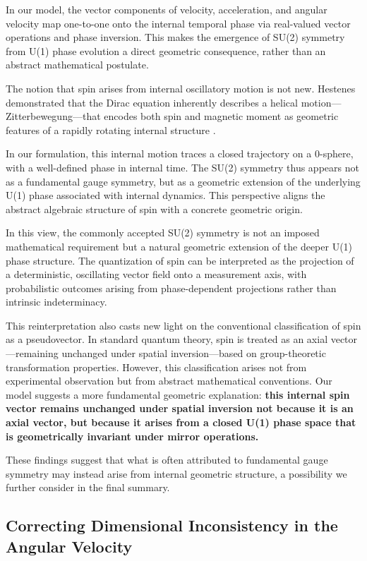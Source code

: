 \documentclass[%
 reprint,
 amsmath,amssymb,
 aps,
]{revtex4-1}
\numberwithin{equation}{section}%
\begin{document}
In our model, the vector components of velocity, acceleration, and angular velocity map one-to-one onto the internal temporal phase via real-valued vector operations and phase inversion. This makes the emergence of SU(2) symmetry from U(1) phase evolution a direct geometric consequence, rather than an abstract mathematical postulate.

The notion that spin arises from internal oscillatory motion is not new. Hestenes demonstrated that the Dirac equation inherently describes a helical motion—Zitterbewegung—that encodes both spin and magnetic moment as geometric features of a rapidly rotating internal structure \cite{hestenes2010}.

In our formulation, this internal motion traces a closed trajectory on a 0-sphere, with a well-defined phase in internal time. The SU(2) symmetry thus appears not as a fundamental gauge symmetry, but as a geometric extension of the underlying U(1) phase associated with internal dynamics. This perspective aligns the abstract algebraic structure of spin with a concrete geometric origin.

In this view, the commonly accepted SU(2) symmetry is not an imposed mathematical requirement but a natural geometric extension of the deeper U(1) phase structure. The quantization of spin can be interpreted as the projection of a deterministic, oscillating vector field onto a measurement axis, with probabilistic outcomes arising from phase-dependent projections rather than intrinsic indeterminacy.

This reinterpretation also casts new light on the conventional classification of spin as a pseudovector. In standard quantum theory, spin is treated as an axial vector—remaining unchanged under spatial inversion—based on group-theoretic transformation properties. However, this classification arises not from experimental observation but from abstract mathematical conventions. Our model suggests a more fundamental geometric explanation: \textbf{this internal spin vector remains unchanged under spatial inversion not because it is an axial vector, but because it arises from a closed U(1) phase space that is geometrically invariant under mirror operations.}

These findings suggest that what is often attributed to fundamental gauge symmetry may instead arise from internal geometric structure, a possibility we further consider in the final summary.


\subsection{Correcting Dimensional Inconsistency in the Angular Velocity}
\end{document}
